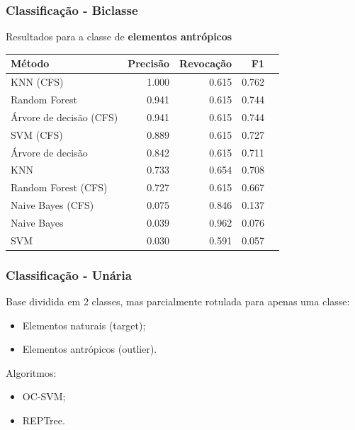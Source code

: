 \documentclass[t]{beamer}
\begin{document}
\begin{frame}[c]
	\frametitle{Classificação - Biclasse}

	\centering
	Resultados para a classe de \textbf{elementos antrópicos}

	\small{
		\begin{table}[h]
		\centering
		\begin{tabulary}{\linewidth}{|L|R|R|R|R|}
		\hline
		\textbf{Método} & \textbf{Precisão} & \textbf{Revocação} & \textbf{F1} \\ \hline
		KNN (CFS)               & 1.000 & 0.615 & 0.762 \\ \hline
		Random Forest           & 0.941 & 0.615 & 0.744 \\ \hline
		Árvore de decisão (CFS) & 0.941 & 0.615 & 0.744 \\ \hline
		SVM (CFS)               & 0.889 & 0.615 & 0.727 \\ \hline
		Árvore de decisão       & 0.842 & 0.615 & 0.711 \\ \hline
		KNN                     & 0.733 & 0.654 & 0.708 \\ \hline
		Random Forest (CFS)     & 0.727 & 0.615 & 0.667 \\ \hline
		Naive Bayes (CFS)       & 0.075 & 0.846 & 0.137 \\ \hline
		Naive Bayes             & 0.039 & 0.962 & 0.076 \\ \hline
		SVM                     & 0.030 & 0.591 & 0.057 \\ \hline
		\end{tabulary}
		\end{table}
	}
\end{frame}

\begin{frame}[c]
	\frametitle{Classificação - Unária}

	Base dividida em 2 classes, mas parcialmente rotulada para apenas uma classe:
	\vspace{0.3cm}
	\begin{itemize}
		\item Elementos naturais (target);
		\item Elementos antrópicos (outlier).
	\end{itemize}

	\vspace{0.5cm}

	Algoritmos:
	\begin{itemize}
		\item OC-SVM;
		\item REPTree.
	\end{itemize}

\end{frame}
\end{document}
